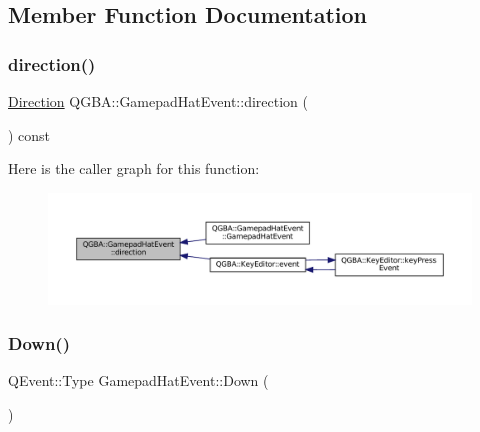 \subsection{Member Function Documentation}
\mbox{\label{class_q_g_b_a_1_1_gamepad_hat_event_ab70c4d31d0decf93df8f0e787945bc76}} 
\subsubsection{\texorpdfstring{direction()}{direction()}}
{\footnotesize\ttfamily \mbox{\hyperlink{class_q_g_b_a_1_1_gamepad_hat_event_ae3f20662c61b054e5344aafb9d843837}{Direction}} Q\+G\+B\+A\+::\+Gamepad\+Hat\+Event\+::direction (\begin{DoxyParamCaption}{ }\end{DoxyParamCaption}) const\hspace{0.3cm}{\ttfamily [inline]}}

Here is the caller graph for this function\+:
\nopagebreak
\begin{figure}[H]
\begin{center}
\leavevmode
\includegraphics[width=350pt]{class_q_g_b_a_1_1_gamepad_hat_event_ab70c4d31d0decf93df8f0e787945bc76_icgraph}
\end{center}
\end{figure}
\mbox{\label{class_q_g_b_a_1_1_gamepad_hat_event_acd067a14064dc04959c60a5c65d74e2c}} 
\subsubsection{\texorpdfstring{Down()}{Down()}}
{\footnotesize\ttfamily Q\+Event\+::\+Type Gamepad\+Hat\+Event\+::\+Down (\begin{DoxyParamCaption}{ }\end{DoxyParamCaption})\hspace{0.3cm}{\ttfamily [static]}}

